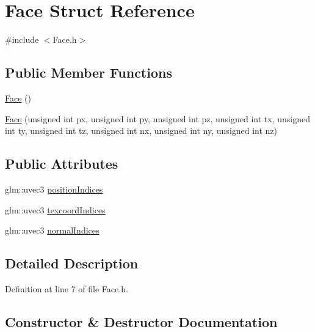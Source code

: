 \hypertarget{struct_face}{}\section{Face Struct Reference}
\label{struct_face}


{\ttfamily \#include $<$Face.\+h$>$}

\subsection*{Public Member Functions}
\begin{DoxyCompactItemize}
\item 
\hyperlink{struct_face_afdb634bc2d5287ba0d62e46b57e9dc2e}{Face} ()
\item 
\hyperlink{struct_face_acc432f36a78d2abdd6d7d7392299013c}{Face} (unsigned int px, unsigned int py, unsigned int pz, unsigned int tx, unsigned int ty, unsigned int tz, unsigned int nx, unsigned int ny, unsigned int nz)
\end{DoxyCompactItemize}
\subsection*{Public Attributes}
\begin{DoxyCompactItemize}
\item 
glm\+::uvec3 \hyperlink{struct_face_a5d796c13d0c71d4d5745ae0597380037}{position\+Indices}
\item 
glm\+::uvec3 \hyperlink{struct_face_abf7b5c4f1771b6ea979d1f38b107c0cf}{texcoord\+Indices}
\item 
glm\+::uvec3 \hyperlink{struct_face_a0d581c67d739a1372557e528b3dbb78a}{normal\+Indices}
\end{DoxyCompactItemize}


\subsection{Detailed Description}


Definition at line 7 of file Face.\+h.



\subsection{Constructor \& Destructor Documentation}
\mbox{\label{struct_face_afdb634bc2d5287ba0d62e46b57e9dc2e}} 
